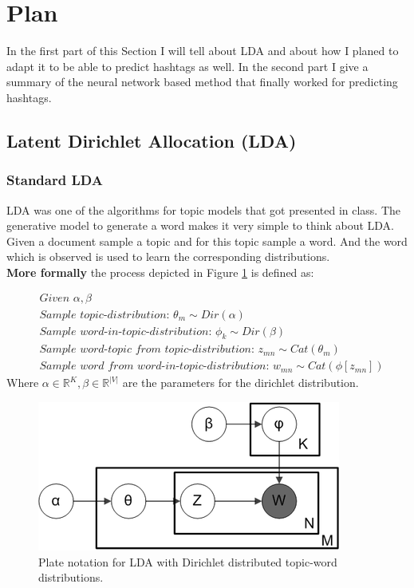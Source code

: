 \documentclass[10pt,conference,compsocconf]{IEEEtran}
\newcommand\R{\mathbb{R}}
\begin{document}
\section{Plan}
\label{sec:Plan}
In the first part of this Section I will tell about LDA and about how I planed to adapt it to be able to predict hashtags as well. In the second part I give a summary of the neural network based method that finally worked for predicting hashtags. 
\subsection{Latent Dirichlet Allocation (LDA)}
\subsubsection{Standard LDA}
LDA was one of the algorithms for topic models that got presented in class. The generative model to generate a word makes it very simple to think about LDA. Given a document sample a topic and for this topic sample a word. And the word which is observed is used to learn the corresponding distributions. \\
\textbf{More formally} the process depicted in Figure \ref{fig:ldaplate} is defined as: 

\small
\begin{align*}
&\textit{Given } \alpha, \beta \\
&\textit{Sample topic-distribution: } \theta_m \sim Dir(\alpha)\\
&\textit{Sample word-in-topic-distribution: } \phi_k \sim Dir(\beta) \\
&\textit{Sample word-topic from topic-distribution: } z_{mn} \sim Cat(\theta_m) \\
&\textit{Sample word from word-in-topic-distribution: } w_{mn} \sim Cat(\phi[z_{mn}])
\end{align*}
\normalsize
Where $\alpha \in \R^K, \beta \in \R^{|V|}$ are the parameters for the dirichlet distribution. 

\begin{figure}
	\centering
	\includegraphics[width=0.7\linewidth]{images/lda_plate}
	\caption{Plate notation for LDA with Dirichlet distributed topic-word distributions.}
	\label{fig:ldaplate}
\end{figure}
\end{document}
